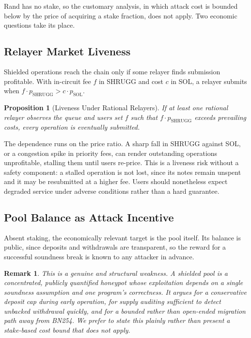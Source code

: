 \documentclass[11pt,a4paper]{article}
\newtheorem{proposition}[theorem]{Proposition}
\newtheorem{remark}[theorem]{Remark}
\begin{document}
Rand has no stake, so the customary analysis, in which attack cost is bounded below by the price of acquiring a stake fraction, does not apply. Two economic questions take its place.

\subsection{Relayer Market Liveness}

Shielded operations reach the chain only if some relayer finds submission profitable. With in-circuit fee $f$ in SHRUGG and cost $c$ in SOL, a relayer submits when $f \cdot p_{\text{SHRUGG}} > c \cdot p_{\text{SOL}}$.

\begin{proposition}[Liveness Under Rational Relayers]
If at least one rational relayer observes the queue and users set $f$ such that $f \cdot p_{\text{SHRUGG}}$ exceeds prevailing costs, every operation is eventually submitted.
\end{proposition}

The dependence runs on the price ratio. A sharp fall in SHRUGG against SOL, or a congestion spike in priority fees, can render outstanding operations unprofitable, stalling them until users re-price. This is a liveness risk without a safety component: a stalled operation is not lost, since its notes remain unspent and it may be resubmitted at a higher fee. Users should nonetheless expect degraded service under adverse conditions rather than a hard guarantee.

\subsection{Pool Balance as Attack Incentive}

Absent staking, the economically relevant target is the pool itself. Its balance is public, since deposits and withdrawals are transparent, so the reward for a successful soundness break is known to any attacker in advance.

\begin{remark}
This is a genuine and structural weakness. A shielded pool is a concentrated, publicly quantified honeypot whose exploitation depends on a single soundness assumption and one program's correctness. It argues for a conservative deposit cap during early operation, for supply auditing sufficient to detect unbacked withdrawal quickly, and for a bounded rather than open-ended migration path away from BN254. We prefer to state this plainly rather than present a stake-based cost bound that does not apply.
\end{remark}
\end{document}
